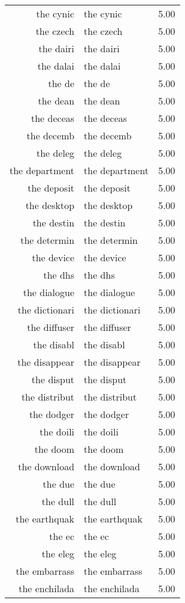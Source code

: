 \begin{table}[ht]
\begin{tabular}{rlr}
  the cynic & the cynic & 5.00 \\ 
  the czech & the czech & 5.00 \\ 
  the dairi & the dairi & 5.00 \\ 
  the dalai & the dalai & 5.00 \\ 
  the de & the de & 5.00 \\ 
  the dean & the dean & 5.00 \\ 
  the deceas & the deceas & 5.00 \\ 
  the decemb & the decemb & 5.00 \\ 
  the deleg & the deleg & 5.00 \\ 
  the department & the department & 5.00 \\ 
  the deposit & the deposit & 5.00 \\ 
  the desktop & the desktop & 5.00 \\ 
  the destin & the destin & 5.00 \\ 
  the determin & the determin & 5.00 \\ 
  the device & the device & 5.00 \\ 
  the dhs & the dhs & 5.00 \\ 
  the dialogue & the dialogue & 5.00 \\ 
  the dictionari & the dictionari & 5.00 \\ 
  the diffuser & the diffuser & 5.00 \\ 
  the disabl & the disabl & 5.00 \\ 
  the disappear & the disappear & 5.00 \\ 
  the disput & the disput & 5.00 \\ 
  the distribut & the distribut & 5.00 \\ 
  the dodger & the dodger & 5.00 \\ 
  the doili & the doili & 5.00 \\ 
  the doom & the doom & 5.00 \\ 
  the download & the download & 5.00 \\ 
  the due & the due & 5.00 \\ 
  the dull & the dull & 5.00 \\ 
  the earthquak & the earthquak & 5.00 \\ 
  the ec & the ec & 5.00 \\ 
  the eleg & the eleg & 5.00 \\ 
  the embarrass & the embarrass & 5.00 \\ 
  the enchilada & the enchilada & 5.00 \\ 

\end{tabular}
\end{table}
